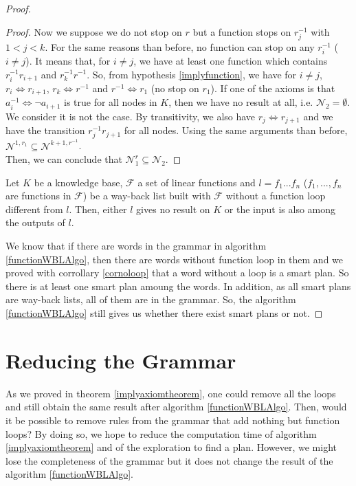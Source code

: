 \documentclass[10pt,a4paper,draft]{article}
\begin{document}
\begin{proof}
\begin{proof}
Now we suppose we do not stop on $r$ but a function stops on $r_j^{-1}$ with $ 1 < j < k$. For the same reasons than before, no function can stop on any $r_i^{-1}$ ($ i \neq j$). It means that, for $i \neq j$, we have at least one function which contains $r_i^{-1} r_{i+1}$ and $r_k^{-1} r^{-1}$. So, from hypothesis \ref{implyfunction}, we have for $i \neq j$, $r_i \Leftrightarrow r_{i+1}$, $r_k \Leftrightarrow r^{-1}$ and $r^{-1} \Leftrightarrow r_1$ (no stop on $r_1$). If one of the axioms is that $a_{i}^{-1} \Leftrightarrow \neg a_{i+1}$ is true for all nodes in $K$, then we have no result at all, i.e. $\mathcal{N}_2 = \emptyset$. We consider it is not the case. By transitivity, we also have $r_j \Leftrightarrow r_{j+1}$ and we have the transition $r_j^{-1} r_{j+1}$ for all nodes. Using the same arguments than before, $\mathcal{N}^{1, r_1} \subseteq \mathcal{N}^{k+1, r^{-1}}$.\\

Then, we can conclude that $\mathcal{N}_1^r \subseteq \mathcal{N}_2$.
\end{proof}


\begin{Corrollary}
\label{cornoloop}
Let $K$ be a knowledge base, $\mathcal{F}$ a set of linear functions and $l = f_1 ... f_n$ ($f_1,...,f_n$ are functions in $\mathcal{F}$) be a way-back list built with $\mathcal{F}$ without a function loop different from $l$. Then, either $l$ gives no result on $K$ or the input is also among the outputs of $l$.
\end{Corrollary}

We know that if there are words in the grammar in algorithm \ref{functionWBLAlgo}, then there are words without function loop in them and we proved with corrollary \ref{cornoloop} that a word without a loop is a smart plan. So there is at least one smart plan amoung the words. In addition, as all smart plans are way-back lists, all of them are in the grammar. So, the algorithm \ref{functionWBLAlgo} still gives us whether there exist smart plans or not.

\end{proof}


\section{Reducing the Grammar}

As we proved in theorem \ref{implyaxiomtheorem}, one could remove all the loops and still obtain the same result after algorithm \ref{functionWBLAlgo}. Then, would it be possible to remove rules from the grammar that add nothing but function loops? By doing so, we hope to reduce the computation time of algorithm \ref{implyaxiomtheorem} and of the exploration to find a plan. However, we might lose the completeness of the grammar but it does not change the result of the algorithm \ref{functionWBLAlgo}.\\
\end{document}

